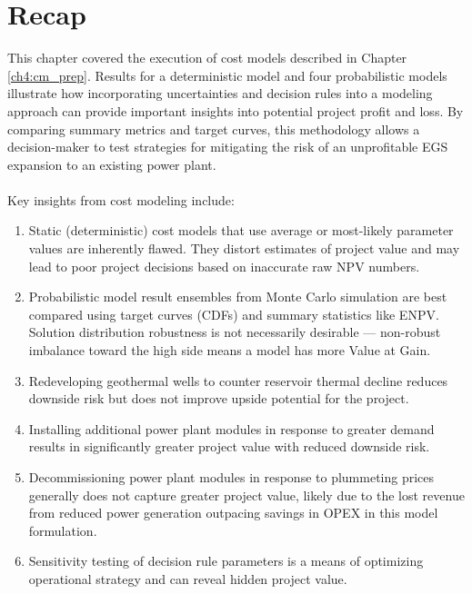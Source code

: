 \section{Recap}\label{ch6:recap}

This chapter covered the execution of cost models described in Chapter \ref{ch4:cm_prep}. Results for a deterministic model and four probabilistic models illustrate how incorporating uncertainties and decision rules into a modeling approach can provide important insights into potential project profit and loss. By comparing summary metrics and target curves, this methodology allows a decision-maker to test strategies for mitigating the risk of an unprofitable EGS expansion to an existing power plant.
\\
\\
Key insights from cost modeling include:
\begin{enumerate}
    \item Static (deterministic) cost models that use average or most-likely parameter values are inherently flawed. They distort estimates of project value and may lead to poor project decisions based on inaccurate raw NPV numbers.
    \item Probabilistic model result ensembles from Monte Carlo simulation are best compared using target curves (CDFs) and summary statistics like ENPV. Solution distribution robustness is not necessarily desirable --- non-robust imbalance toward the high side means a model has more Value at Gain.
    \item Redeveloping geothermal wells to counter reservoir thermal decline reduces downside risk but does not improve upside potential for the project.
    \item Installing additional power plant modules in response to greater demand results in significantly greater project value with reduced downside risk.
    \item Decommissioning power plant modules in response to plummeting prices generally does not capture greater project value, likely due to the lost revenue from reduced power generation outpacing savings in OPEX in this model formulation.
    \item Sensitivity testing of decision rule parameters is a means of optimizing operational strategy and can reveal hidden project value.
\end{enumerate}
